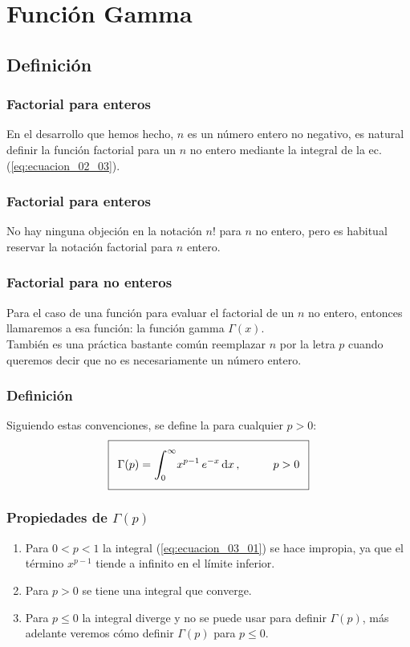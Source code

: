 \documentclass[12pt]{beamer}
\begin{document}
\section{Función Gamma}
\subsection{Definición}

\begin{frame}
\frametitle{Factorial para enteros}
En el desarrollo que hemos hecho, $n$ es un número entero no negativo, es natural definir la función factorial para un $n$ no entero mediante la integral de la ec.(\ref{eq:ecuacion_02_03}).
\end{frame}
\begin{frame}
\frametitle{Factorial para enteros}
No hay ninguna objeción en la notación $n!$ para $n$ no entero, pero es habitual reservar la notación factorial para $n$ entero.
\end{frame}
\begin{frame}
\frametitle{Factorial para no enteros}
Para el caso de una función para evaluar el factorial de un $n$ no entero, entonces llamaremos a esa función: la función gamma $\Gamma (x)$.
\\
\bigskip
\pause
También es una práctica bastante común reemplazar $n$ por la letra $p$ cuando queremos decir que no es necesariamente un número entero.
\end{frame}
\begin{frame}
\frametitle{Definición}
Siguiendo estas convenciones, se define la  para cualquier $p > 0$:
\pause
\begin{align}\addtolength{\fboxsep}{5pt}\boxed{
\Gamma (p) = \scaleint{6ex}_{\bs 0}^{\infty} x^{p-1} \, e^{-x} \dd{x}, \hspace{1cm} p > 0}
\label{eq:ecuacion_03_01}
\end{align}
\end{frame}
\begin{frame}
\frametitle{Propiedades de $\Gamma (p)$}
\begin{enumerate}[<+->]
\item Para $0 < p < 1$ la integral (\ref{eq:ecuacion_03_01}) se hace impropia, ya que el término $x^{p-1}$ tiende a infinito en el límite inferior.
\item Para $p > 0$ se tiene una integral que converge.
\item Para $p \leq 0$ la integral diverge y no se puede usar para definir $\Gamma (p)$, más adelante veremos cómo definir  $\Gamma (p)$ para $p \leq 0$.
\end{enumerate}
\end{frame}
\end{document}

